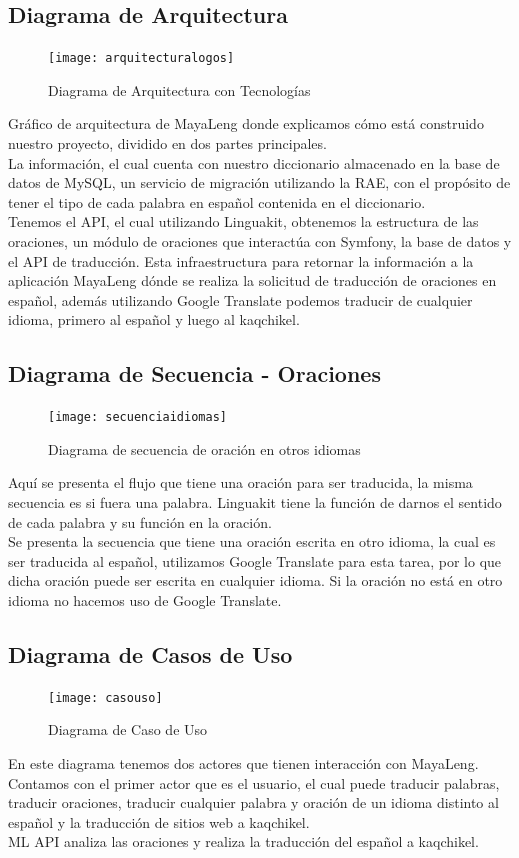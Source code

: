 \documentclass[a4paper,openright,11pt]{article}
\begin{document}
\subsection{Diagrama de Arquitectura}
\begin{figure}[H]
	\centering
	\texttt{[image: arquitecturalogos]}
	\caption{Diagrama de Arquitectura con Tecnologías} 
	\label{fig:arqL}
\end{figure}
Gráfico de arquitectura de MayaLeng donde explicamos cómo está construido nuestro proyecto, dividido en dos partes principales.\\
La información, el cual cuenta con nuestro diccionario almacenado en la base de datos de MySQL, un servicio de migración utilizando la RAE, con el propósito de tener el tipo de cada palabra en español contenida en el diccionario.\\
Tenemos el API, el cual utilizando Linguakit, obtenemos la estructura de las oraciones, un módulo de oraciones que interactúa con Symfony, la base de datos y el API de traducción. Esta infraestructura para retornar la información a la aplicación MayaLeng dónde se realiza la solicitud de traducción de oraciones en español, además utilizando Google Translate podemos traducir de cualquier idioma, primero al español y luego al kaqchikel.

\subsection{Diagrama de Secuencia - Oraciones}
\begin{figure}[H]
	\centering
	\texttt{[image: secuenciaidiomas]}
	\caption{Diagrama de secuencia de oración en otros idiomas}
	\label{fig:seci}
\end{figure}
Aquí se presenta el flujo que tiene una oración para ser traducida, la misma secuencia es si fuera una palabra. Linguakit tiene la función de darnos el sentido de cada palabra y su función en la oración.\\
Se presenta la secuencia que tiene una oración escrita en otro idioma, la cual es ser traducida al español, utilizamos Google Translate para esta tarea, por lo que dicha oración puede ser escrita en cualquier idioma. Si la oración no está en otro idioma no hacemos uso de Google Translate.

\newpage
\subsection{Diagrama de Casos de Uso}
\begin{figure}[h]
	\centering
	\texttt{[image: casouso]}
	\caption{Diagrama de Caso de Uso}
	\label{fig:caso}
\end{figure}
En este diagrama tenemos dos actores que tienen interacción con MayaLeng. Contamos con el primer actor que es el usuario, el cual puede traducir palabras, traducir oraciones, traducir cualquier palabra y oración de un idioma distinto al español y la traducción de sitios web a kaqchikel.\\
ML API analiza las oraciones y realiza la traducción del español a kaqchikel.
\newpage
\end{document}

